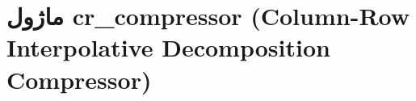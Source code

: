 \section{ماژول cr\_compressor (Column-Row Interpolative Decomposition Compressor)}
\label{sec:module_cr_compressor}
